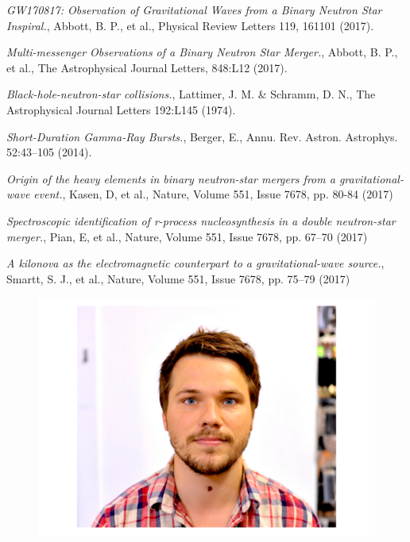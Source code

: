 \documentclass[twocolumn]{article}
\begin{document}
\begin{thebibliography}{9}
 \emph{GW170817: Observation of Gravitational Waves from a Binary Neutron Star Inspiral.},
Abbott, B. P., et al., Physical Review Letters 119, 161101 (2017).

 \emph{Multi-messenger Observations of a Binary Neutron Star Merger.},
Abbott, B. P., et al., The Astrophysical Journal Letters, 848:L12 (2017).

 \emph{Black-hole-neutron-star collisions.},
Lattimer, J. M. \& Schramm, D. N., The Astrophysical Journal Letters 192:L145 (1974).

 \emph{Short-Duration Gamma-Ray Bursts.},
Berger, E., Annu. Rev. Astron. Astrophys. 52:43–105 (2014).

 \emph{Origin of the heavy elements in binary neutron-star
mergers from a gravitational-wave event.},
Kasen, D, et al., Nature, Volume 551, Issue 7678, pp. 80-84 (2017)

 \emph{Spectroscopic identification of r-process nucleosynthesis in a double neutron-star merger.},
Pian, E, et al., Nature, Volume 551, Issue 7678, pp. 67–70 (2017)

 \emph{A kilonova as the electromagnetic counterpart to a gravitational-wave source.},
Smartt, S. J., et al., Nature, Volume 551, Issue 7678, pp. 75–79 (2017)









\end{thebibliography}

\captionsetup[figure]{labelformat=empty}

\begin{figure}[!htbp]
\begin{center}
\includegraphics[width=0.5 \columnwidth]{me}
\end{center}
\end{figure}
\end{document}
